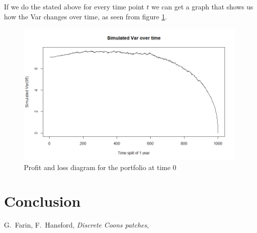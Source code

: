 \documentclass[a4paper, 12pt]{article}
\theoremstyle{definition}
\theoremstyle{plain}
\theoremstyle{definition}
\begin{document}
 \newpage 

If we do the stated above for every time point $t$ we 
can get a graph that shows us how the Var changes over time,
as seen from figure \ref{fig:var}. 

\begin{figure}[!ht]
    \centering
    \caption{Profit and loss diagram for the portfolio
            at time 0}
    \label{fig:var}
    \includegraphics[scale=0.65]{var_sim.png}
 \end{figure}

\section{Conclusion}

\begin{thebibliography}{99}
    G.~Farin, F.~Hansford, \emph{Discrete Coons patches}, 
 \end{thebibliography}
 
\end{document}
